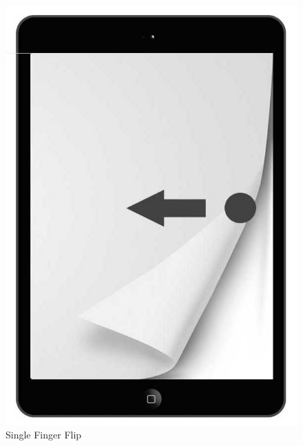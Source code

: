 \documentclass[11pt, oneside]{article}   	%
\begin{document}
\begin{figure}[!hb]
    \centering
    \includegraphics[scale=0.3]{Flip-1.jpg}
    \caption{Single Finger Flip}
    \label{fig:Flip-1}
\end{figure}
\end{document}
